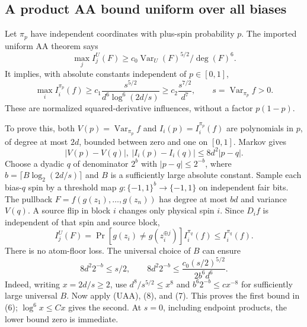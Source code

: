 \subsection{A product AA bound uniform over all
biases}\label{influence-recovery:a-product-aa-bound-uniform-over-all-biases}

Let \(\pi_p\) have independent coordinates with plus-spin probability
\(p\). The imported uniform AA theorem says \[
 \max_j I_j^U(F)\ge c_0\operatorname{Var}_U(F)^{5/2}/\deg(F)^6.\tag{UAA}
\] It implies, with absolute constants independent of \(p\in[0,1]\), \[
 \max_i I_i^{\pi_p}(f)
 \ge c_1\frac{s^{5/2}}{d^6\log^6(2d/s)}
 \ge c_2\frac{s^{7/2}}{d^7},\qquad
 s=\operatorname{Var}_{\pi_p}f>0.                         \tag{6}
\] These are normalized squared-derivative influences, without a factor
\(p(1-p)\).

To prove this, both \(V(p)=\operatorname{Var}_{\pi_p}f\) and
\(I_i(p)=I_i^{\pi_p}(f)\) are polynomials in \(p\), of degree at most
\(2d\), bounded between zero and one on \([0,1]\). Markov gives \[
 |V(p)-V(q)|,\ |I_i(p)-I_i(q)|\le8d^2|p-q|.               \tag{7}
\] Choose a dyadic \(q\) of denominator \(2^b\) with \(|p-q|\le2^{-b}\),
where \(b=\lceil B\log_2(2d/s)\rceil\) and \(B\) is a sufficiently large
absolute constant. Sample each bias-\(q\) spin by a threshold map
\(g:\{-1,1\}^b\to\{-1,1\}\) on independent fair bits. The pullback
\(F=f(g(z_1),\ldots,g(z_n))\) has degree at most \(bd\) and variance
\(V(q)\). A source flip in block \(i\) changes only physical spin \(i\).
Since \(D_i f\) is independent of that spin and source block, \[
 I_j^U(F)=\Pr[g(z_i)\ne g(z_i^{\oplus j})]I_i^{\pi_q}(f)
 \le I_i^{\pi_q}(f).                                    \tag{8}
\] There is no atom-floor loss. The universal choice of \(B\) can ensure
\[
 8d^2 2^{-b}\le s/2,\qquad
 8d^2 2^{-b}\le \frac{c_0(s/2)^{5/2}}{2b^6d^6}.           \tag{9}
\] Indeed, writing \(x=2d/s\ge2\), use \(d^8/s^{5/2}\le x^8\) and
\(b^6 2^{-b}\le c x^{-8}\) for sufficiently large universal \(B\). Now
apply (UAA), (8), and (7). This proves the first bound in (6);
\(\log^6x\le Cx\) gives the second. At \(s=0\), including endpoint
products, the lower bound zero is immediate.
